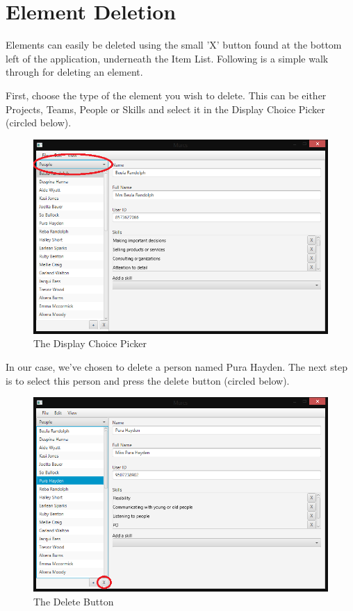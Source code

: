 \section{Element Deletion}

Elements can easily be deleted using the small 'X' button found at the bottom left of the application, underneath the Item List. Following is a simple walk through for deleting an element.

First, choose the type of the element you wish to delete. This can be either Projects, Teams, People or Skills and select it in the Display Choice Picker (circled below).

\begin{figure}[H]
\centering
\includegraphics[width=\textwidth]{images/screenshots/deletion1.PNG}
\caption{The Display Choice Picker}
\label{fig:new_project}
\end{figure}

In our case, we've chosen to delete a person named Pura Hayden. The next step is to select this person and press the delete button (circled below).

\begin{figure}[H]
\centering
\includegraphics[width=\textwidth]{images/screenshots/deletion2.PNG}
\caption{The Delete Button}
\label{fig:new_project}
\end{figure}

